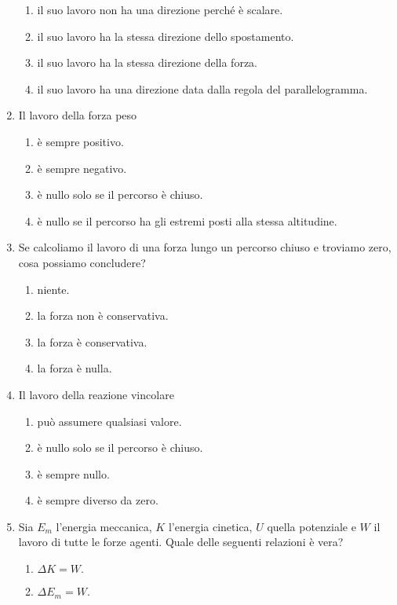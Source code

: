 \documentclass{article}
\begin{document}
\begin{enumerate}
  \begin{enumerate}[label=\Alph*.]
    \item il suo lavoro non ha una direzione perché è scalare.
    \item il suo lavoro ha la stessa direzione dello spostamento.
    \item il suo lavoro ha la stessa direzione della forza.
    \item il suo lavoro ha una direzione data dalla regola del parallelogramma.
  \end{enumerate}
  \item Il lavoro della forza peso
  \begin{enumerate}[label=\Alph*.]
    \item è sempre positivo.
    \item è sempre negativo.
    \item è nullo solo se il percorso è chiuso.
    \item è nullo se il percorso ha gli estremi posti alla stessa altitudine.
  \end{enumerate}
  \item Se calcoliamo il lavoro di una forza lungo un percorso chiuso e troviamo zero, cosa possiamo concludere?
  \begin{enumerate}[label=\Alph*.]
    \item niente.
    \item la forza non è conservativa.
    \item la forza è conservativa.
    \item la forza è nulla.
  \end{enumerate}
  \item Il lavoro della reazione vincolare
  \begin{enumerate}[label=\Alph*.]
    \item può assumere qualsiasi valore.
    \item è nullo solo se il percorso è chiuso.
    \item è sempre nullo.
    \item è sempre diverso da zero.
  \end{enumerate}
  \item Sia $E_m$ l'energia meccanica, $K$ l'energia cinetica, $U$ quella potenziale e $W$ il lavoro di tutte le forze agenti. Quale delle seguenti relazioni è vera?
  \begin{enumerate}[label=\Alph*.]
    \item $\Delta K=W.$
    \item $\Delta E_m=W$.

\end{enumerate}
\end{enumerate}
\end{document}
